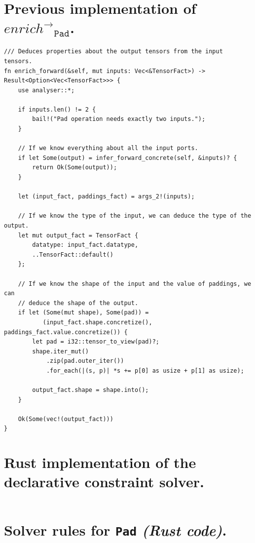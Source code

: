 \section{Previous implementation of ${enrich^\rightarrow}_\texttt{Pad}$.}
\label{appendix-analyser-pad-code}
\begin{verbatim}
/// Deduces properties about the output tensors from the input tensors.
fn enrich_forward(&self, mut inputs: Vec<&TensorFact>) -> Result<Option<Vec<TensorFact>>> {
    use analyser::*;

    if inputs.len() != 2 {
        bail!("Pad operation needs exactly two inputs.");
    }

    // If we know everything about all the input ports.
    if let Some(output) = infer_forward_concrete(self, &inputs)? {
        return Ok(Some(output));
    }

    let (input_fact, paddings_fact) = args_2!(inputs);

    // If we know the type of the input, we can deduce the type of the output.
    let mut output_fact = TensorFact {
        datatype: input_fact.datatype,
        ..TensorFact::default()
    };

    // If we know the shape of the input and the value of paddings, we can
    // deduce the shape of the output.
    if let (Some(mut shape), Some(pad)) =
           (input_fact.shape.concretize(), paddings_fact.value.concretize()) {
        let pad = i32::tensor_to_view(pad)?;
        shape.iter_mut()
            .zip(pad.outer_iter())
            .for_each(|(s, p)| *s += p[0] as usize + p[1] as usize);
        
        output_fact.shape = shape.into();
    }

    Ok(Some(vec!(output_fact)))
}
\end{verbatim}

\bigskip
{}

\newpage
\section{Rust implementation of the declarative constraint solver.}
\label{appendix-analyser-solver-impl}
\inputminted{rust}{analyser-solver.rs}

\newpage
\section{Solver rules for \texttt{Pad} \textit{(Rust code)}.}
\label{appendix-analyser-pad-rules}

